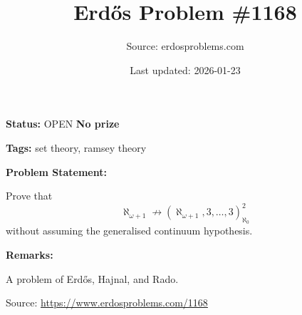 \documentclass{article}
\title{Erd\H{o}s Problem \#1168}
\date{Last updated: 2026-01-23}
\author{Source: erdosproblems.com}
\begin{document}
\maketitle

\noindent\textbf{Status:} OPEN \quad \textbf{No prize}

\noindent\textbf{Tags:} set theory, ramsey theory

\medskip
\noindent\textbf{Problem Statement:}

Prove that\[\aleph_{\omega+1}\not\to (\aleph_{\omega+1}, 3,\ldots,3)_{\aleph_0}^2\]without assuming the generalised continuum hypothesis.

\bigskip
\noindent\textbf{Remarks:}

A problem of Erd\H{o}s, Hajnal, and Rado.

\bigskip
\noindent\small{Source: \url{https://www.erdosproblems.com/1168}}
\end{document}
